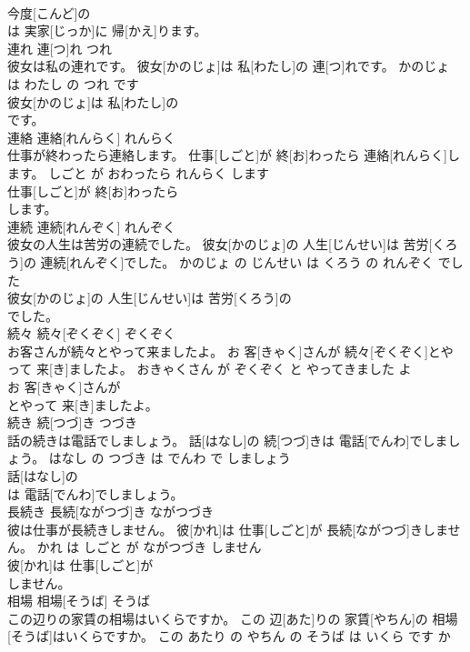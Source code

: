 \documentclass[8pt]{extreport}
\begin{document}
\begin{CJK}{UTF8}{min}
\\	今度[こんど]の
\\	は 実家[じっか]に 帰[かえ]ります。			
\\	連れ	連[つ]れ	つれ	
\\	彼女は私の連れです。	彼女[かのじょ]は 私[わたし]の 連[つ]れです。	かのじょ は わたし の つれ です	
\\	彼女[かのじょ]は 私[わたし]の
\\	です。			
\\	連絡	連絡[れんらく]	れんらく	
\\	仕事が終わったら連絡します。	仕事[しごと]が 終[お]わったら 連絡[れんらく]します。	しごと が おわったら れんらく します	
\\	仕事[しごと]が 終[お]わったら
\\	します。			
\\	連続	連続[れんぞく]	れんぞく	
\\	彼女の人生は苦労の連続でした。	彼女[かのじょ]の 人生[じんせい]は 苦労[くろう]の 連続[れんぞく]でした。	かのじょ の じんせい は くろう の れんぞく でした	
\\	彼女[かのじょ]の 人生[じんせい]は 苦労[くろう]の
\\	でした。			
\\	続々	続々[ぞくぞく]	ぞくぞく	
\\	お客さんが続々とやって来ましたよ。	お 客[きゃく]さんが 続々[ぞくぞく]とやって 来[き]ましたよ。	おきゃくさん が ぞくぞく と やってきました よ	
\\	お 客[きゃく]さんが
\\	とやって 来[き]ましたよ。			
\\	続き	続[つづ]き	つづき	
\\	話の続きは電話でしましょう。	話[はなし]の 続[つづ]きは 電話[でんわ]でしましょう。	はなし の つづき は でんわ で しましょう	
\\	話[はなし]の
\\	は 電話[でんわ]でしましょう。			
\\	長続き	長続[ながつづ]き	ながつづき	
\\	彼は仕事が長続きしません。	彼[かれ]は 仕事[しごと]が 長続[ながつづ]きしません。	かれ は しごと が ながつづき しません	
\\	彼[かれ]は 仕事[しごと]が
\\	しません。			
\\	相場	相場[そうば]	そうば	
\\	この辺りの家賃の相場はいくらですか。	この 辺[あた]りの 家賃[やちん]の 相場[そうば]はいくらですか。	この あたり の やちん の そうば は いくら です か	

\end{CJK}
\end{document}
